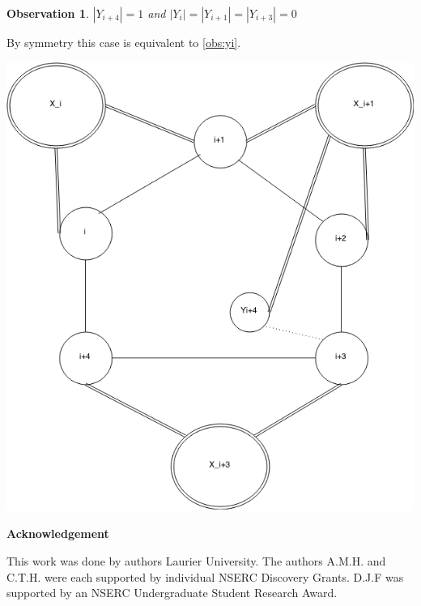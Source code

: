 \documentclass[12pt]{article}
\newtheorem{Observation}[Theorem]{Observation}
\begin{document}
\begin{Observation}\label{obs:yi4}
$|Y_{i+4}| = 1$ and $|Y_{i}| = |Y_{i+1}| = |Y_{i+3}| = 0$
\end{Observation}
\begin{minipage}{0.5\textwidth}%
	 By symmetry this case is equivalent to \ref{obs:yi}.
\end{minipage}
\hfill
\begin{minipage}{0.5\textwidth}\raggedleft
	\includegraphics[width=\linewidth]{Yi4.png}
\end{minipage}

\begin{center}
{\bf Acknowledgement}
\end{center}
This work was done by authors  Laurier University. The authors A.M.H. and C.T.H. were each supported by individual NSERC Discovery Grants. D.J.F was supported by an NSERC Undergraduate Student Research Award.


\clearpage
\begin{thebibliography}{99}

\end{thebibliography}
\end{document}
